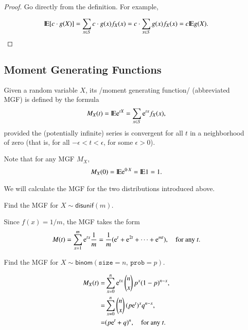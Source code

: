 \documentclass[captions=tableheading]{scrbook}
\begin{document}
\begin{proof}
Go directly from the definition. For example,

\[
\mathrm{I\hspace{-1.5pt}E}[c\cdot g(X)]=\sum_{x\in S}c\cdot g(x)f_{X}(x)=c\cdot\sum_{x\in S}g(x)f_{X}(x)=c\mathrm{I\hspace{-1.5pt}E} g(X).
\]

\end{proof}
\subsection{Moment Generating Functions}
\label{sec-1-4-2}

\label{sub:MGFs}

\begin{defn}
Given a random variable \(X\), its /moment generating function/ (abbreviated MGF) is defined by the formula
\begin{equation}
M_{X}(t)=\mathrm{I\hspace{-1.5pt}E}\mathrm{e}^{tX}=\sum_{x\in S}\mathrm{e}^{tx}f_{X}(x),
\end{equation}
provided the (potentially infinite) series is convergent for all \(t\) in a neighborhood of zero (that is, for all \(-\epsilon<t<\epsilon\), for some \(\epsilon>0\)). 
\end{defn}


Note that for any MGF \(M_{X}\),
\begin{equation}
M_{X}(0)=\mathrm{I\hspace{-1.5pt}E}\mathrm{e}^{0\cdot X}=\mathrm{I\hspace{-1.5pt}E}1=1.
\end{equation}

We will calculate the MGF for the two distributions introduced above.

\begin{example}
Find the MGF for \(X\sim\mathsf{disunif}(m)\). 

Since \(f(x)=1/m\), the MGF takes the form
\[
M(t)=\sum_{x=1}^{m}\mathrm{e}^{tx}\frac{1}{m}=\frac{1}{m}(\mathrm{e}^{t}+\mathrm{e}^{2t}+\cdots+\mathrm{e}^{mt}),\quad\mbox{for any \ensuremath{t}.}
\]

\end{example}

\begin{example}
Find the MGF for \(X\sim\mathsf{binom}(\mathtt{size}=n,\,\mathtt{prob}=p)\).
\end{example}

\begin{alignat*}{1}
M_{X}(t)= & \sum_{x=0}^{n}\mathrm{e}^{tx}\,{n \choose x}\, p^{x}(1-p)^{n-x},\\
= & \sum_{x=0}^{n}{n \choose x}\,(p\mathrm{e}^{t})^{x}q^{n-x},\\
= & (p\mathrm{e}^{t}+q)^{n},\quad\mbox{for any \ensuremath{t}.}
\end{alignat*}
\end{document}
